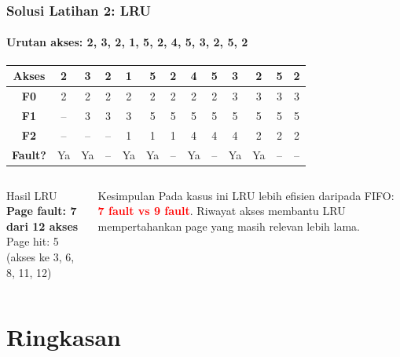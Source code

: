 \documentclass[t,aspectratio=169,xcolor=dvipsnames]{beamer}
\newcommand{\tem}[1]{\textbf{\textcolor{red}{#1}}}
\begin{document}
\begin{frame}
    \frametitle{Solusi Latihan 2: LRU}
    \framesubtitle{Urutan akses: 2, 3, 2, 1, 5, 2, 4, 5, 3, 2, 5, 2}
    \footnotesize

    \begin{tabular}{|c|c|c|c|c|c|c|c|c|c|c|c|c|}
        \hline
        \textbf{Akses} & 2 & 3 & 2 & 1 & 5 & 2 & 4 & 5 & 3 & 2 & 5 & 2 \\
        \hline
        \textbf{F0} & \cellcolor{green!20}2 & 2 & 2 & 2 & 2 & 2 & 2 & 2 & \cellcolor{red!20}3 & 3 & 3 & 3 \\
        \hline
        \textbf{F1} & -- & \cellcolor{green!20}3 & 3 & 3 & \cellcolor{red!20}5 & 5 & 5 & 5 & 5 & 5 & 5 & 5 \\
        \hline
        \textbf{F2} & -- & -- & -- & \cellcolor{green!20}1 & 1 & 1 & \cellcolor{red!20}4 & 4 & 4 & \cellcolor{red!20}2 & 2 & 2 \\
        \hline
        \textbf{Fault?} & \cellcolor{green!20}Ya & \cellcolor{green!20}Ya & -- & \cellcolor{green!20}Ya & \cellcolor{red!20}Ya & -- & \cellcolor{red!20}Ya & -- & \cellcolor{red!20}Ya & \cellcolor{red!20}Ya & -- & -- \\
        \hline
    \end{tabular}

    \vspace{0.15cm}
    \begin{columns}[T]
        \begin{exampleblock}{Hasil LRU}
            \textbf{Page fault: 7 dari 12 akses}\\
            Page hit: 5 (akses ke 3, 6, 8, 11, 12)
        \end{exampleblock}

        \begin{block}{Kesimpulan}
            Pada kasus ini LRU lebih efisien daripada FIFO: \tem{7 fault vs 9 fault}. Riwayat akses membantu LRU mempertahankan page yang masih relevan lebih lama.
        \end{block}
    \end{columns}
\end{frame}

\section{Ringkasan}
\end{document}
